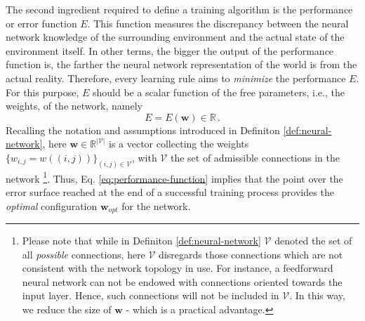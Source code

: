 \documentclass[12pt, a4paper, twoside, openright, notitlepage]{report}
\numberwithin{equation}{chapter}
\theoremstyle{theorem}
\theoremstyle{definition}
\theoremstyle{remark}
\theoremstyle{proposition}
\numberwithin{figure}{chapter}
\begin{document}
		The second ingredient required to define a training algorithm is the performance or error function $E$. This function measures the discrepancy between the neural network knowledge of the surrounding environment and the actual state of the environment itself. In other terms, the bigger the output of the performance function is, the farther the neural network representation of the world is from the actual reality. Therefore, every learning rule aims to \emph{minimize} the performance $E$. For this purpose, $E$ should be a scalar function of the free parameters, i.e., the weights, of the network, namely 
		\begin{equation}
			\label{eq:performance-function}
			E = E(\mathbf{w}) \in \mathbb{R} \, . 
		\end{equation}
		Recalling the notation and assumptions introduced in Definiton \ref{def:neural-network}, here $\mathbf{w} \in \mathbb{R}^{|\mathcal{V}|}$ is a vector collecting the weights $\big\lbrace w_{i,j} = w((i,j)) \big\rbrace_{(i,j) \in \mathcal{V}}$, with $\mathcal{V}$ the set of admissible connections in the network \footnote{Please note that while in Definiton \ref{def:neural-network} $\mathcal{V}$ denoted the set of all \emph{possible} connections, here $\mathcal{V}$ disregards those connections which are not consistent with the network topology in use. For instance, a feedforward neural network can not be endowed with connections oriented towards the input layer. Hence, such connections will not be included in $\mathcal{V}$. In this way, we reduce the size of $\mathbf{w}$ - which is a practical advantage.}. Thus, Eq. \eqref{eq:performance-function} implies that the point over the error surface reached at the end of a successful training process provides the \emph{optimal} configuration $\mathbf{w}_{opt}$ for the network.
		
\end{document}
